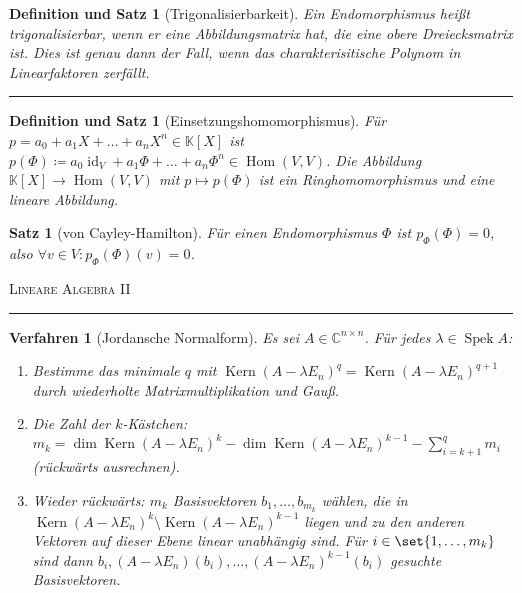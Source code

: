 \documentclass[a4paper]{article}
\newcounter{Sec}
\theoremstyle{marginbreak}
\newtheorem{satz}[definition]{Satz}
\newtheorem{defsatz}[definition]{Definition und Satz}
\newtheorem{verfahren}[definition]{Verfahren}
\DeclareMathOperator{\Kern}{Kern}
\DeclareMathOperator{\Hom}{Hom}
\DeclareMathOperator{\id}{id}
\DeclareMathOperator{\Spek}{Spek}
\newcommand{\sep}{%
	\rule{\textwidth}{0.3pt}%
	\stepcounter{Sec}%
	}
\begin{document}
	\begin{defsatz}[Trigonalisierbarkeit]
		Ein Endomorphismus heißt trigonalisierbar, wenn er eine Abbildungsmatrix hat,
		die eine obere Dreiecksmatrix ist. Dies ist genau dann der Fall, wenn das
		charakterisitische Polynom in Linearfaktoren zerfällt.
	\end{defsatz}
	\sep
	\begin{defsatz}[Einsetzungshomomorphismus]
		Für $p = a_0 + a_1X + \ldots + a_nX^n \in\mathbb{K}[X]$ ist $p(\Phi)\coloneqq a_0\id_V+a_1\Phi+\ldots+a_n\Phi^n \in\Hom(V, V)$.
		Die Abbildung $\mathbb{K}[X]\to\Hom(V, V)$ mit $p\mapsto p(\Phi)$ ist ein Ringhomomorphismus und eine lineare Abbildung.
	\end{defsatz}
	\begin{satz}[von Cayley-Hamilton]
		Für einen Endomorphismus $\Phi$ ist $p_\Phi(\Phi) = 0$, also $\forall v\in V: p_\Phi(\Phi)(v) = 0$.
	\end{satz}
	\newpage
	\textsc{Lineare Algebra II}

	\sep
	\begin{verfahren}[Jordansche Normalform]
		Es sei $A\in\mathbb{C}^{n\times n}$. Für jedes $\lambda\in\Spek A$:
		\begin{enumerate}
			\item Bestimme das minimale $q$ mit $\Kern(A-\lambda E_n)^q = \Kern(A-\lambda E_n)^{q+1}$
			durch wiederholte Matrixmultiplikation und Gauß.
			\item Die Zahl der $k$-Kästchen: $m_k = \dim\Kern(A-\lambda E_n)^k - \dim\Kern(A-\lambda E_n)^{k - 1} - \sum_{i=k+1}^q m_i$
			(rückwärts ausrechnen).
			\item Wieder rückwärts: $m_k$ Basisvektoren $b_1, \ldots, b_{m_k}$ wählen, die in $\Kern(A-\lambda E_n)^k \setminus \Kern(A-\lambda E_n)^{k - 1}$
			liegen und zu den anderen Vektoren auf dieser Ebene linear unabhängig sind. Für $i\in\set{1,\ldots,m_k}$ sind dann
			$b_i, (A-\lambda E_n)(b_i), \ldots, (A-\lambda E_n)^{k - 1}(b_i)$ gesuchte Basisvektoren.
		\end{enumerate}
	\end{verfahren}
\end{document}
